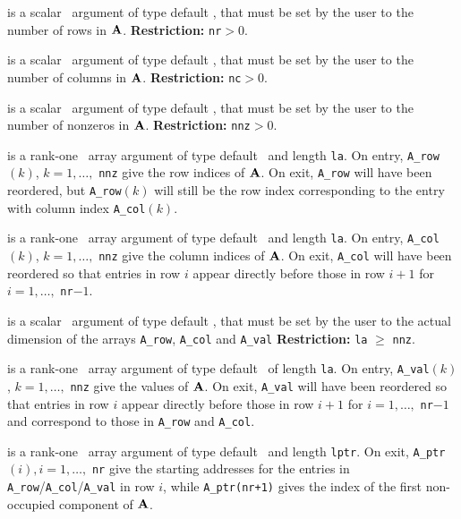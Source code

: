 \documentclass{galahad}
\begin{document}
\begin{description}

 is a scalar \intentin\ argument of type default
\integer, that must be set by the user to the number of
rows in ${\mathbf{A}}$. 
{\bf Restriction:} {\tt nr}$ > 0$.

 is a scalar \intentin\ argument of type default
\integer, that must be set by the user to the number of
columns in ${\mathbf{A}}$. 
{\bf Restriction:} {\tt nc}$ > 0$.

 is a scalar \intentin\ argument of type default
\integer, that must be set by the user to the number of
nonzeros in ${\mathbf{A}}$. 
{\bf Restriction:} {\tt nnz}$ > 0$.

  is a rank-one \intentinout\ array argument of type default 
\integer\ and length {\tt la}.
On entry, {\tt A\_row}$(k)$, $k = 1, \ldots,$ {\tt nnz} give 
the row indices of ${\mathbf{A}}$. On exit, {\tt A\_row} will have been reordered, but
{\tt A\_row}$(k)$ will still be the row index corresponding to the
entry with column index {\tt A\_col}$(k)$.

  is a rank-one \intentinout\ array argument of type default 
\integer\ and length {\tt la}.
On entry, {\tt A\_col}$(k)$, $k = 1, \ldots,$ {\tt nnz} give 
the column indices of ${\mathbf{A}}$. On exit, {\tt A\_col} 
will have been reordered so that entries in row $i$ appear directly before 
those in row $i+1$ for $i = 1, \ldots ,$ {\tt nr}$-1$.

is a scalar \intentin\ argument of type default
\integer, that must be set by the user to the actual dimension of the arrays 
{\tt A\_row},
{\tt A\_col}
and
{\tt A\_val}
{\bf Restriction:} {\tt la} $\geq$ {\tt nnz}.

is a rank-one \intentinout\ array argument of type default 
\realdp\ of length {\tt la}. 
On entry, {\tt A\_val}$(k)$, $k = 1, \ldots,$ {\tt nnz} give the
values of ${\mathbf{A}}$. 
On exit, {\tt A\_val} will have been reordered so that
entries in row $i$ appear directly before those in row $i+1$ for 
$i = 1, \ldots,$ {\tt nr}$-1$ and correspond to those in 
{\tt A\_row} and {\tt A\_col}.

  is a rank-one \intentout\ array argument of type default 
\integer\ and length {\tt lptr}.
On exit, {\tt A\_ptr}$(i), i = 1, \ldots,$ {\tt nr} give 
the starting addresses for the entries in {\tt A\_row}/{\tt A\_col}/{\tt A\_val}
in row $i$, while {\tt A\_ptr(nr+1)} 
gives the index of the first non-occupied component of ${\mathbf{A}}$.


\end{description}
\end{document}
